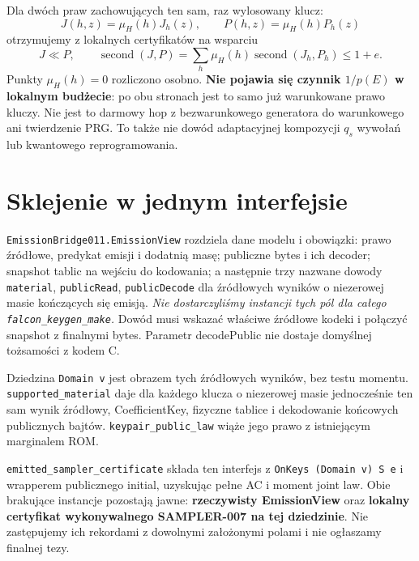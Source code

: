\documentclass[11pt,a4paper]{article}
\newcommand{\code}[1]{\nolinkurl{#1}}
\begin{document}
Dla dwóch praw zachowujących ten sam, raz wylosowany klucz:
\[
 J(h,z)=\mu_H(h)J_h(z),\qquad P(h,z)=\mu_H(h)P_h(z)
\]
otrzymujemy z lokalnych certyfikatów na wsparciu
\[
 J\ll P,\qquad
 \operatorname{second}(J,P)
 =\sum_h\mu_H(h)\operatorname{second}(J_h,P_h)\le1+e.
\]
Punkty $\mu_H(h)=0$ rozliczono osobno. \textbf{Nie pojawia się czynnik
$1/p(E)$ w lokalnym budżecie}: po obu stronach jest to samo już warunkowane
prawo kluczy. Nie jest to darmowy hop z bezwarunkowego generatora do
warunkowego ani twierdzenie PRG. To także nie dowód adaptacyjnej kompozycji
$q_s$ wywołań lub kwantowego reprogramowania.

\section{Sklejenie w jednym interfejsie}
\code{EmissionBridge011.EmissionView} rozdziela dane modelu i obowiązki:
prawo źródłowe, predykat emisji i dodatnią masę; publiczne bytes i ich decoder;
snapshot tablic na wejściu do kodowania; a następnie trzy nazwane dowody
\code{material}, \code{publicRead}, \code{publicDecode} dla źródłowych
wyników o niezerowej masie kończących się emisją.
\emph{Nie dostarczyliśmy instancji tych pól dla całego \code{falcon_keygen_make}.}
Dowód musi wskazać właściwe źródłowe kodeki i połączyć snapshot z finalnymi bytes.
Parametr decodePublic nie dostaje domyślnej tożsamości z kodem C.

Dziedzina \code{Domain v} jest obrazem tych źródłowych wyników, bez testu
momentu. \code{supported_material} daje dla każdego klucza o niezerowej
masie jednocześnie ten sam wynik źródłowy, CoefficientKey, fizyczne tablice
i dekodowanie końcowych publicznych bajtów. \code{keypair_public_law}
wiąże jego prawo z istniejącym marginalem ROM.

\code{emitted_sampler_certificate} składa ten interfejs z
\code{OnKeys (Domain v) S e} i wrapperem publicznego initial, uzyskując
pełne AC i moment joint law. Obie brakujące instancje pozostają jawne:
\textbf{rzeczywisty EmissionView} oraz \textbf{lokalny certyfikat
wykonywalnego SAMPLER-007 na tej dziedzinie}. Nie zastępujemy ich rekordami
z dowolnymi założonymi polami i nie ogłaszamy finalnej tezy.
\end{document}
